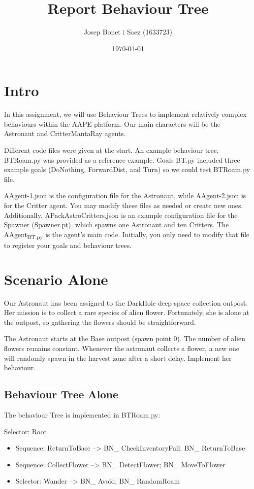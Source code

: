 \documentclass[11pt]{article}
\author{Josep Bonet i Saez (1633723)}
\date{\today}
\title{Report Behaviour Tree}
\begin{document}
\maketitle
\tableofcontents

\section{Intro}
\label{sec:org99374d3}
In this assignment, we will use Behaviour Trees to implement relatively complex behaviours within the AAPE platform. Our main characters will be the Astronaut and CritterMantaRay agents.

Different code files were given at the start. An example behaviour tree, BTRoam.py was provided as a reference example. Goals BT.py included three example goals (DoNothing, ForwardDist, and Turn) so we could test BTRoam.py file.

AAgent-1.json is the configuration file for the Astronaut, while AAgent-2.json is for
the Critter agent. You may modify these files as needed or create new ones.
Additionally, APackAstroCritters.json is an example configuration file for the
Spawner (Spawner.pt), which spawns one Astronaut and ten Critters.
The AAgent\textsubscript{BT.py} is the agent's main code. Initially, you only need to modify that file
to register your goals and behaviour trees.
\section{Scenario Alone}
\label{sec:org0401d27}
Our Astronaut has been assigned to the DarkHole deep-space collection outpost. Her mission is to collect a rare species of alien flower. Fortunately, she is alone at the outpost, so gathering the flowers should be straightforward.

The Astronaut starts at the Base outpost (spawn point 0). The number of alien flowers remains constant. Whenever the astronaut collects a flower, a new one will randomly spawn in the harvest zone after a short delay. Implement her behaviour.
\subsection{Behaviour Tree Alone}
\label{sec:org41db1b6}
The behaviour Tree is implemented in BTRoam.py:

Selector: Root
\begin{itemize}
\item Sequence: ReturnToBase --> BN\_ CheckInventoryFull; BN\_ ReturnToBase
\item Sequence: CollectFlower --> BN\_ DetectFlower; BN\_ MoveToFlower
\item Selector: Wander --> BN\_ Avoid; BN\_ RandomRoam
\end{itemize}
\end{document}
